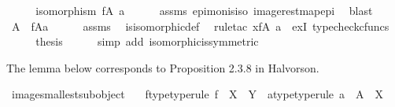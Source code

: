 \begin{isabellebody}
\ \ \isamarkupfalse%
\ \isamarkupfalse%
\ {\isachardoublequoteopen}isomorphism\ {\isacharparenleft}{\kern0pt}f{\isasymrestriction}\isactrlbsub {\isacharparenleft}{\kern0pt}A{\isacharcomma}{\kern0pt}\ a{\isacharparenright}{\kern0pt}\isactrlesub {\isacharparenright}{\kern0pt}{\isachardoublequoteclose}\isanewline
\ \ \ \ \isamarkupfalse%
\ assms\ epi{\isacharunderscore}{\kern0pt}mon{\isacharunderscore}{\kern0pt}is{\isacharunderscore}{\kern0pt}iso\ image{\isacharunderscore}{\kern0pt}rest{\isacharunderscore}{\kern0pt}map{\isacharunderscore}{\kern0pt}epi\ \isamarkupfalse%
\ blast\isanewline
\ \ \isamarkupfalse%
\ \isamarkupfalse%
\ {\isachardoublequoteopen}A\ {\isasymcong}\ f{\isasymlparr}A{\isasymrparr}\isactrlbsub a\isactrlesub {\isachardoublequoteclose}\isanewline
\ \ \ \ \isamarkupfalse%
\ assms\ \isamarkupfalse%
\ is{\isacharunderscore}{\kern0pt}isomorphic{\isacharunderscore}{\kern0pt}def\ \isamarkupfalse%
\ {\isacharparenleft}{\kern0pt}rule{\isacharunderscore}{\kern0pt}tac\ x{\isacharequal}{\kern0pt}{\isachardoublequoteopen}f{\isasymrestriction}\isactrlbsub {\isacharparenleft}{\kern0pt}A{\isacharcomma}{\kern0pt}\ a{\isacharparenright}{\kern0pt}\isactrlesub {\isachardoublequoteclose}\ \ exI{\isacharcomma}{\kern0pt}\ typecheck{\isacharunderscore}{\kern0pt}cfuncs{\isacharparenright}{\kern0pt}\isanewline
\ \ \isamarkupfalse%
\ \isamarkupfalse%
\ {\isacharquery}{\kern0pt}thesis\isanewline
\ \ \ \ \isamarkupfalse%
\ {\isacharparenleft}{\kern0pt}simp\ add{\isacharcolon}{\kern0pt}\ isomorphic{\isacharunderscore}{\kern0pt}is{\isacharunderscore}{\kern0pt}symmetric{\isacharparenright}{\kern0pt}\isanewline
{}\isamarkupfalse%
%
\endisatagproof
{\isafoldproof}%
%
\isadelimproof
%
\endisadelimproof
%
\begin{isamarkuptext}%
The lemma below corresponds to Proposition 2.3.8 in Halvorson.%
\end{isamarkuptext}\isamarkuptrue%
\isamarkupfalse%
\ image{\isacharunderscore}{\kern0pt}smallest{\isacharunderscore}{\kern0pt}subobject{\isacharcolon}{\kern0pt}\isanewline
\ \ \ f{\isacharunderscore}{\kern0pt}type{\isacharbrackleft}{\kern0pt}type{\isacharunderscore}{\kern0pt}rule{\isacharbrackright}{\kern0pt}{\isacharcolon}{\kern0pt}\ {\isachardoublequoteopen}f\ {\isacharcolon}{\kern0pt}\ X\ {\isasymrightarrow}\ Y{\isachardoublequoteclose}\ \ a{\isacharunderscore}{\kern0pt}type{\isacharbrackleft}{\kern0pt}type{\isacharunderscore}{\kern0pt}rule{\isacharbrackright}{\kern0pt}{\isacharcolon}{\kern0pt}\ {\isachardoublequoteopen}a\ {\isacharcolon}{\kern0pt}\ A\ {\isasymrightarrow}\ X{\isachardoublequoteclose}\isanewline

\end{isabellebody}
